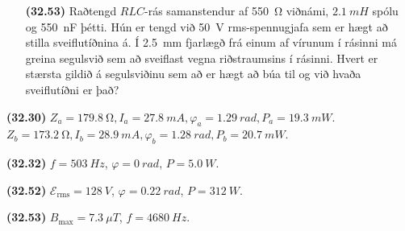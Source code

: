 \begin{enumerate}[label = \textbf{(\alph*)}]
\item[\textbf{(32.53)}] Raðtengd $RLC$-rás samanstendur af \SI{550}{\ohm} viðnámi, $\SI{2.1}{mH}$ spólu og \SI{550}{nF} þétti. Hún er tengd við \SI{50}{V} rms-spennugjafa sem er hægt að stilla sveiflutíðnina á. Í \SI{2.5}{mm} fjarlægð frá einum af vírunum í rásinni má greina segulsvið sem að sveiflast vegna riðstraumsins í rásinni. Hvert er stærsta gildið á segulsviðinu sem að er hægt að búa til og við hvaða sveiflutíðni er það?

\end{enumerate}

\begin{tcolorbox}
\begin{enumerate*}[label = ]
  \item \textbf{(32.30)} $Z_a = \SI{179.8}{\ohm}, I_a = \SI{27.8}{mA}, \varphi_a = \SI{1.29}{rad}, P_a = \SI{19.3}{mW}$. \\  $Z_b =\SI{173.2}{\ohm}, I_b = \SI{28.9}{mA}, \varphi_b = \SI{1.28}{rad}, P_b = \SI{20.7}{mW}$.
  \item \textbf{(32.32)} $f = \SI{503}{Hz}$, $\varphi = \SI{0}{rad}$, $P = \SI{5.0}{W}$.
  \item \textbf{(32.52)} $\mathcal{E}_{\text{rms}} = \SI{128}{V}$, $\varphi = \SI{0.22}{rad}$, $P = \SI{312}{W}$.
  \item \textbf{(32.53)} $B_{\text{max}} = \SI{7.3}{\mu T}$, $f = \SI{4680}{Hz}$.
\end{enumerate*}
\end{tcolorbox}

\newpage